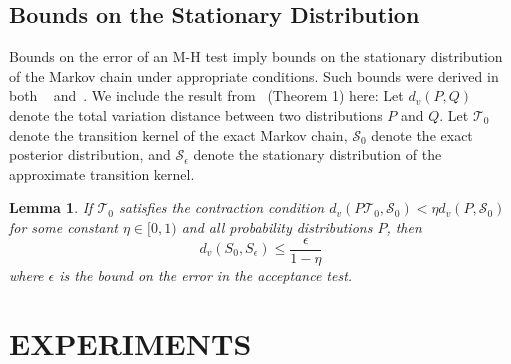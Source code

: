 \documentclass[twoside]{article} \usepackage{aistats2017}
\newtheorem{lemma}{Lemma}
\begin{document}


\subsection{Bounds on the Stationary Distribution}
Bounds on the error of an M-H test imply bounds on the stationary distribution
of the Markov chain under appropriate conditions. Such bounds were derived in
both ~\citet{cutting_mh_2014} and~\citet{icml2014c1_bardenet14}. We include the
result from~\citet{cutting_mh_2014} (Theorem 1) here: Let $d_v(P,Q)$ denote the
total variation distance between two distributions $P$ and $Q$.  Let
$\mathcal{T}_0$ denote the transition kernel of the exact Markov chain,
$\mathcal{S}_0$ denote the exact posterior distribution, and
$\mathcal{S}_{\epsilon}$ denote the stationary distribution of the approximate
transition kernel. 
\begin{lemma}
If $\mathcal{T}_0$ satisfies the contraction condition
$d_v(P\mathcal{T}_0,\mathcal{S}_0) < \eta d_v(P,\mathcal{S}_0)$ for some
constant $\eta\in [0,1)$ and all probability distributions $P$, then
\begin{equation}
      d_v(S_0, S_{\epsilon}) \leq\frac{\epsilon}{1-\eta}
\end{equation}
where $\epsilon$ is the bound on the error in the acceptance test. 
\end{lemma}


\section{EXPERIMENTS}\label{sec:experiments}
\end{document}
